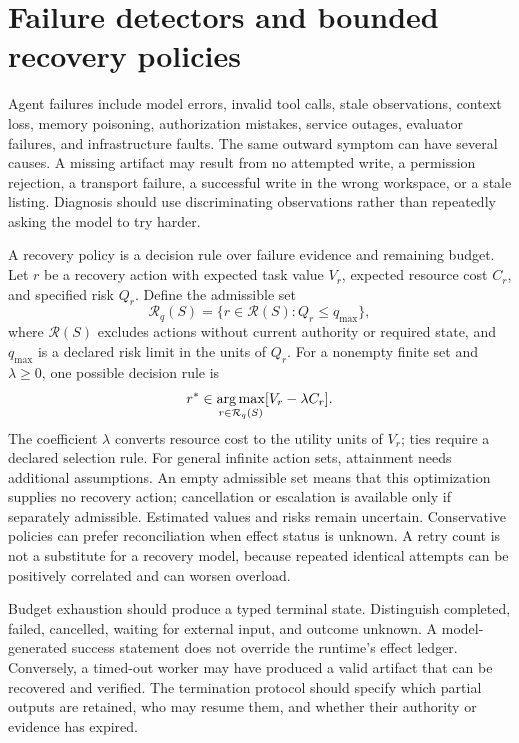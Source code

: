 \section{Failure detectors and bounded recovery policies}\label{sec:C32:05}
Agent failures include model errors, invalid tool calls, stale observations, context loss, memory poisoning, authorization mistakes, service outages, evaluator failures, and infrastructure faults. The same outward symptom can have several causes. A missing artifact may result from no attempted write, a permission rejection, a transport failure, a successful write in the wrong workspace, or a stale listing. Diagnosis should use discriminating observations rather than repeatedly asking the model to try harder.

A recovery policy is a decision rule over failure evidence and remaining budget. Let $r$ be a recovery action with expected task value $V_r$, expected resource cost $C_r$, and specified risk $Q_r$. Define the admissible set
\begin{equation}
 \mathcal R_q(S)=\{r\in\mathcal R(S):Q_r\leq q_{\max}\},
\end{equation}
where $\mathcal R(S)$ excludes actions without current authority or required state, and $q_{\max}$ is a declared risk limit in the units of $Q_r$. For a nonempty finite set and $\lambda\geq0$, one possible decision rule is
\begin{equation}
 r^*\in\operatorname*{arg\,max}_{r\in\mathcal R_q(S)}[V_r-\lambda C_r].
\end{equation}
The coefficient $\lambda$ converts resource cost to the utility units of $V_r$; ties require a declared selection rule. For general infinite action sets, attainment needs additional assumptions. An empty admissible set means that this optimization supplies no recovery action; cancellation or escalation is available only if separately admissible. Estimated values and risks remain uncertain. Conservative policies can prefer reconciliation when effect status is unknown. A retry count is not a substitute for a recovery model, because repeated identical attempts can be positively correlated and can worsen overload.

Budget exhaustion should produce a typed terminal state. Distinguish completed, failed, cancelled, waiting for external input, and outcome unknown. A model-generated success statement does not override the runtime's effect ledger. Conversely, a timed-out worker may have produced a valid artifact that can be recovered and verified. The termination protocol should specify which partial outputs are retained, who may resume them, and whether their authority or evidence has expired.

